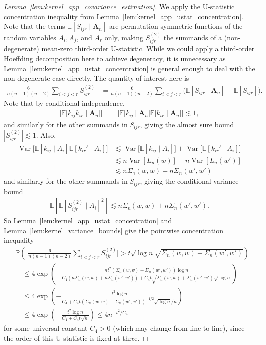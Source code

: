 \documentclass[11pt,lof]{puthesis}
\renewcommand{\P}{\ensuremath{\mathbb{P}}}
\newcommand{\E}{\ensuremath{\mathbb{E}}}
\newcommand{\bA}{\ensuremath{\mathbf{A}}}
\DeclareMathOperator{\Var}{Var}
\theoremstyle{break}
\theoremstyle{proof}
\newtheorem{proof}{Proof}
\begin{document}
\begin{proof}[Lemma~\ref{lem:kernel_app_covariance_estimation}]
We apply the U-statistic concentration inequality from
Lemma~\ref{lem:kernel_app_ustat_concentration}.
Note that the terms
$\E[S_{i j r} \mid \bA_n]$
are permutation-symmetric functions of
the random variables
$A_i, A_j$, and $A_r$ only,
making $S_{i j r}^{(2)}$ the summands of
a (non-degenerate) mean-zero third-order U-statistic.
While we could apply a third-order Hoeffding decomposition
here to achieve degeneracy,
it is unnecessary as Lemma~\ref{lem:kernel_app_ustat_concentration}
is general enough to deal with the non-degenerate case directly.
The quantity of interest here is
%
\begin{align*}
\frac{6}{n(n-1)(n-2)}
\sum_{i<j<r}
S_{i j r}^{(2)}
&=
\frac{6}{n(n-1)(n-2)}
\sum_{i<j<r}
\Big(
\E[S_{i j r} \mid \bA_n]
- \E[S_{i j r}]
\Big).
\end{align*}
%
Note that by conditional independence,
%
\begin{align*}
\big|
\E\big[
k_{i j}k_{i r} \mid \bA_n
\big]
\big|
&=
\big|
\E\big[
k_{i j} \mid \bA_n
\big]
\E\big[
k_{i r} \mid \bA_n
\big]
\big|
\lesssim 1,
\end{align*}
%
and similarly for the other summands in $S_{i j r}$,
giving the almost sure bound
$|S_{i j r}^{(2)}| \lesssim 1$. Also,
%
\begin{align*}
\Var\big[ \E[k_{i j} \mid A_i] \E[k_{i r}' \mid A_i] \big]
&\lesssim
\Var\big[\E[k_{i j} \mid A_i]\big]
+ \Var\big[\E[k_{i r}' \mid A_i]\big] \\
&\lesssim
n \Var[L_n(w)] + n \Var[L_n(w')] \\
&\lesssim
n \Sigma_n(w,w) + n \Sigma_n(w',w')
\end{align*}
%
and similarly for the other summands in $S_{i j r}$,
giving the conditional variance bound
%
\begin{align*}
\E[\E[S_{i j r}^{(2)} \mid A_i]^2] \lesssim
n \Sigma_n(w,w) + n \Sigma_n(w',w').
\end{align*}
%
So Lemma~\ref{lem:kernel_app_ustat_concentration}
and Lemma~\ref{lem:kernel_variance_bounds}
give the pointwise concentration inequality
%
\begin{align*}
&\P\left(
\Bigg|
\frac{6}{n(n-1)(n-2)}
\sum_{i<j<r}
S_{i j r}^{(2)}
\Bigg|
> t \sqrt{\log n} \sqrt{\Sigma_n(w,w) + \Sigma_n(w',w')}
\right) \\
&\quad\leq
4 \exp \left(
- \frac{n t^2 (\Sigma_n(w,w) + \Sigma_n(w',w')) \log n}
{C_4 (n\Sigma_n(w,w) + n\Sigma_n(w',w'))
+ C_4 t \sqrt{\Sigma_n(w,w) + \Sigma_n(w',w')}\sqrt{\log n}}
\right) \\
&\quad\leq
4 \exp \left(
- \frac{t^2 \log n}
{C_4
+ C_4 t (\Sigma_n(w,w) + \Sigma_n(w',w'))^{-1/2} \sqrt{\log n} / n}
\right) \\
&\quad\leq
4 \exp \left(
- \frac{t^2 \log n}
{C_4
+ C_4 t \sqrt{h}}
\right)
\leq
4 n^{-t^2 / C_4}
\end{align*}
%
for some universal constant $C_4 > 0$
(which may change from line to line),
since the order of this U-statistic is fixed at three.


\end{proof}
\end{document}
